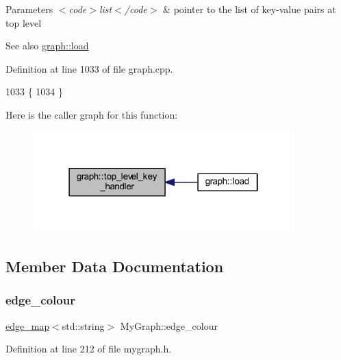 \begin{DoxyParams}{Parameters}
{\em $<$code$>$list$<$/code$>$} & pointer to the list of key-\/value pairs at top level \\
\hline
\end{DoxyParams}
\begin{DoxySeeAlso}{See also}
\mbox{\hyperlink{classgraph_ac28cb3468623a480709d3329033d4ec8}{graph\+::load}} 
\end{DoxySeeAlso}


Definition at line 1033 of file graph.\+cpp.


\begin{DoxyCode}
1033                                               \{
1034 \}
\end{DoxyCode}
Here is the caller graph for this function\+:
\nopagebreak
\begin{figure}[H]
\begin{center}
\leavevmode
\includegraphics[width=286pt]{classgraph_a33bc9b45f0d4738c491535147b703cc5_icgraph}
\end{center}
\end{figure}


\subsection{Member Data Documentation}
\mbox{\label{class_my_graph_aa10654166ca504696731c7f8011a5680}} 
\subsubsection{\texorpdfstring{edge\+\_\+colour}{edge\_colour}}
{\footnotesize\ttfamily \mbox{\hyperlink{classedge__map}{edge\+\_\+map}}$<$std\+::string$>$ My\+Graph\+::edge\+\_\+colour\hspace{0.3cm}{\ttfamily [protected]}}



Definition at line 212 of file mygraph.\+h.

